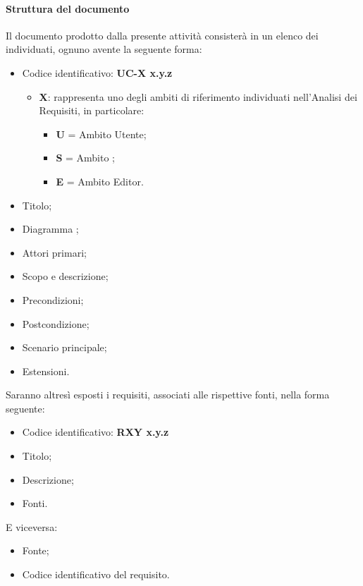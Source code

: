 			
			\paragraph*{Struttura del documento}
			Il documento prodotto dalla presente attivit\`a consister\`a in un elenco dei  individuati, 
                        ognuno avente la seguente forma:
				\begin{itemize}
				\item Codice identificativo: \textbf{UC-{X} x.y.z}
						\begin{itemize}
						\item \textbf{X}: rappresenta uno degli ambiti di riferimento individuati
						nell'Analisi dei Requisiti, in particolare:
							\begin{itemize}
							\item [] \textbf{U} = Ambito Utente;
							\item [] \textbf{S} = Ambito ;
							\item [] \textbf{E} = Ambito Editor. 
							\end{itemize}
						\end{itemize}
				\item Titolo;
				\item Diagramma ;
				\item Attori primari;
				\item Scopo e descrizione;
				\item Precondizioni;
				\item Postcondizione;
				\item Scenario principale;
                                \item Estensioni.
				\end{itemize}
			Saranno altresì esposti i requisiti, associati alle rispettive fonti, nella forma seguente:
				\begin{itemize}
				\item Codice identificativo: \textbf{R{X}{Y} x.y.z}
				\item Titolo;
				\item Descrizione;
                \item Fonti.
				\end{itemize}
			E viceversa:
				\begin{itemize}
				\item Fonte;
				\item Codice identificativo del requisito.
				\end{itemize}
